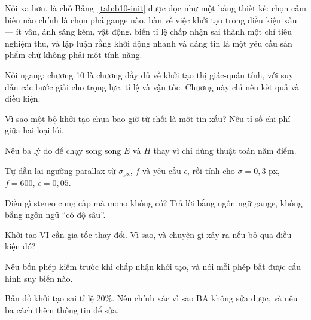 \documentclass[../../vslam.tex]{subfiles}
\begin{document}
Nối xa hơn.  là chỗ Bảng~\ref{tab:b10-init} được đọc như một bảng thiết kế: chọn cảm biến nào chính là chọn phá gauge nào.  bàn về việc khởi tạo trong điều kiện xấu --- ít vân, ánh sáng kém, vật động.  biến tỉ lệ chấp nhận sai thành một chỉ tiêu nghiệm thu, và lập luận rằng khởi động nhanh và đáng tin là một yêu cầu sản phẩm chứ không phải một tính năng.

Nối ngang:  chương 10 là chương đầy đủ về khởi tạo thị giác-quán tính, với suy dẫn các bước giải cho trọng lực, tỉ lệ và vận tốc. Chương này chỉ nêu kết quả và điều kiện.

\begin{tukiem}
\item Vì sao một bộ khởi tạo chưa bao giờ từ chối là một tin xấu? Nêu tỉ số chi phí giữa hai loại lỗi.
\item Nêu ba lý do để chạy song song \(E\) và \(H\) thay vì chỉ dùng thuật toán năm điểm.
\item Tự dẫn lại ngưỡng parallax từ \(\sigma_{\text{px}}\), \(f\) và yêu cầu \(\epsilon\), rồi tính cho \(\sigma=0{,}3\) px, \(f=600\), \(\epsilon=0{,}05\).
\item Điều gì stereo cung cấp mà mono không có? Trả lời bằng ngôn ngữ gauge, không bằng ngôn ngữ ``có độ sâu''.
\item Khởi tạo VI cần gia tốc thay đổi. Vì sao, và chuyện gì xảy ra nếu bỏ qua điều kiện đó?
\item Nêu bốn phép kiểm trước khi chấp nhận khởi tạo, và nói mỗi phép bắt được cấu hình suy biến nào.
\item Bản đồ khởi tạo sai tỉ lệ \(20\%\). Nêu chính xác vì sao BA không sửa được, và nêu ba cách thêm thông tin để sửa.
\end{tukiem}
\ifSubfilesClassLoaded{\printbibliography[title={Nguồn}]}{}
\end{document}
